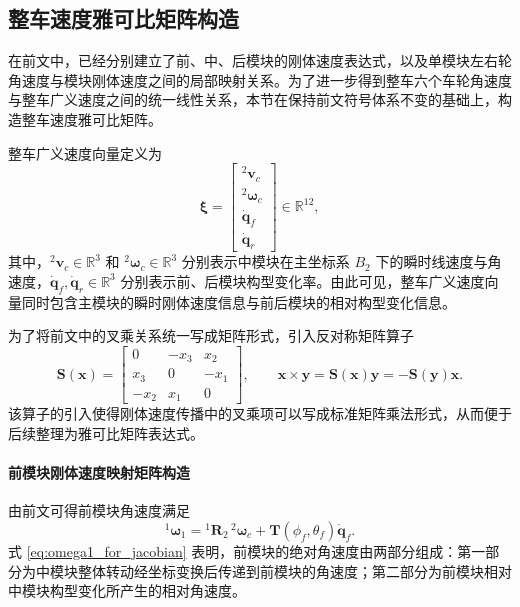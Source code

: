 \subsection{整车速度雅可比矩阵构造}

在前文中，已经分别建立了前、中、后模块的刚体速度表达式，以及单模块左右轮角速度与模块刚体速度之间的局部映射关系。为了进一步得到整车六个车轮角速度与整车广义速度之间的统一线性关系，本节在保持前文符号体系不变的基础上，构造整车速度雅可比矩阵。

整车广义速度向量定义为
\begin{equation}
\boldsymbol\xi=
\begin{bmatrix}
{}^{2}\mathbf v_c\\
{}^{2}\boldsymbol\omega_c\\
\dot{\mathbf q}_f\\
\dot{\mathbf q}_r
\end{bmatrix}
\in\mathbb R^{12},
\label{eq:xi_vehicle}
\end{equation}
其中，${}^{2}\mathbf v_c\in\mathbb R^3$ 和 ${}^{2}\boldsymbol\omega_c\in\mathbb R^3$ 分别表示中模块在主坐标系 ${B_2}$ 下的瞬时线速度与角速度，$\dot{\mathbf q}_f,\dot{\mathbf q}_r\in\mathbb R^3$ 分别表示前、后模块构型变化率。由此可见，整车广义速度向量同时包含主模块的瞬时刚体速度信息与前后模块的相对构型变化信息。

为了将前文中的叉乘关系统一写成矩阵形式，引入反对称矩阵算子
\begin{equation}
\mathbf S(\mathbf x)=
\begin{bmatrix}
0 & -x_3 & x_2\\
x_3 & 0 & -x_1\\
-x_2 & x_1 & 0
\end{bmatrix},
\qquad
\mathbf x\times \mathbf y=\mathbf S(\mathbf x)\mathbf y=-\mathbf S(\mathbf y)\mathbf x.
\label{eq:skew}
\end{equation}
该算子的引入使得刚体速度传播中的叉乘项可以写成标准矩阵乘法形式，从而便于后续整理为雅可比矩阵表达式。

\paragraph{前模块刚体速度映射矩阵构造}

由前文可得前模块角速度满足
\begin{equation}
{}^{1}\boldsymbol\omega_1
=
{}^{1}\mathbf R_2\,{}^{2}\boldsymbol\omega_c
+
\mathbf T(\phi_f,\theta_f)\dot{\mathbf q}_f.
\label{eq:omega1_for_jacobian}
\end{equation}
式 \eqref{eq:omega1_for_jacobian} 表明，前模块的绝对角速度由两部分组成：第一部分为中模块整体转动经坐标变换后传递到前模块的角速度；第二部分为前模块相对中模块构型变化所产生的相对角速度。

